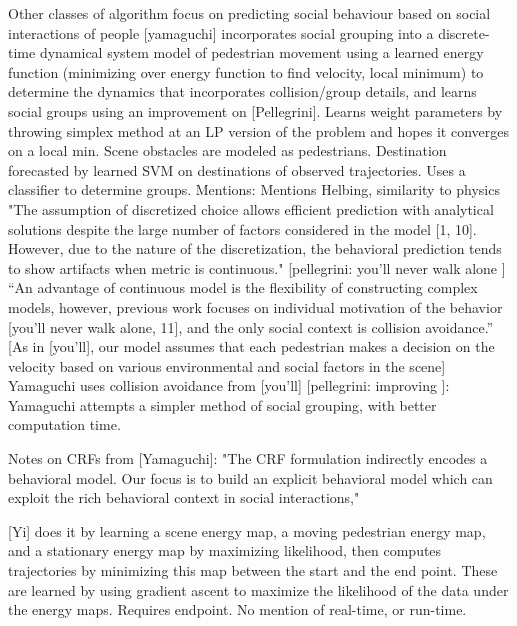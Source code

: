 \documentclass[usenames,dvipsnames]{article}
\begin{document}
\begin{enumerate}
Other classes of algorithm focus on predicting social behaviour based on  social interactions of people 
	[yamaguchi] incorporates social grouping into a discrete-time dynamical system model of pedestrian movement using a learned energy function (minimizing over energy function to find velocity, local minimum) to determine the dynamics that incorporates collision/group details, and learns social groups using an improvement on [Pellegrini]. Learns weight parameters by throwing simplex method at an LP version of the problem and hopes it converges on a local min. Scene obstacles are modeled as pedestrians. Destination forecasted by learned SVM on destinations of observed trajectories. Uses a classifier to determine groups.
	Mentions:
	Mentions Helbing, similarity to physics
	"The assumption of discretized choice allows efficient prediction
	with analytical solutions despite the large number of
	factors considered in the model [1, 10]. However, due to the
	nature of the discretization, the behavioral prediction tends
	to show artifacts when metric is continuous."
	[pellegrini: you'll never walk alone ] ``An advantage of continuous model is the flexibility of constructing
	complex models, however, previous work focuses
	on individual motivation of the behavior [you'll never walk alone, 11], and the
	only social context is collision avoidance.''
	[As in [you'll], our model assumes that each pedestrian makes a
	decision on the velocity based on various environmental
	and social factors in the scene]
	Yamaguchi uses collision avoidance from [you'll]
	[pellegrini: improving ]: Yamaguchi attempts a simpler method of social grouping, with better computation time.
	
	Notes on CRFs from [Yamaguchi]: "The CRF formulation indirectly
	encodes a behavioral model. Our focus is to build an
	explicit behavioral model which can exploit the rich behavioral
	context in social interactions,"
	
	[Yi] does it by learning a scene energy map, a moving pedestrian energy map, and a stationary energy map by maximizing likelihood, then computes trajectories by minimizing this map between the start and the end point. These are learned by using gradient ascent to maximize the likelihood of the data under the energy maps. Requires endpoint. No mention of real-time, or run-time.
	

\end{enumerate}
\end{document}
